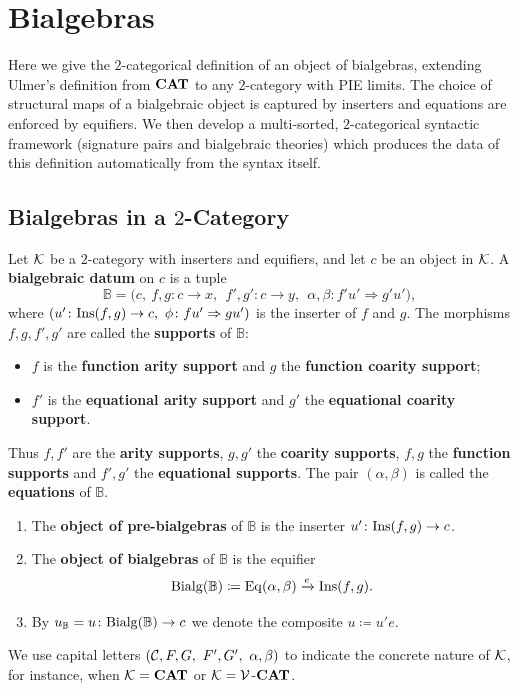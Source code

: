 
\section{Bialgebras}\label{sec:bialgebras}

Here we give the $2$-categorical definition of an object of bialgebras, extending Ulmer's definition \cite{Ulmer1977Bialgebras} from $\mathbf{CAT}$ to any $2$-category with PIE limits. The choice of structural maps of a bialgebraic object is captured by inserters and equations are enforced by equifiers. We then develop a multi-sorted, $2$-categorical syntactic framework (signature pairs and bialgebraic theories) which produces the data of this definition automatically from the syntax itself.

\subsection{Bialgebras in a \texorpdfstring{$2$}{2}-Category}

\begin{definition}\label{def:general_bialgebras}
   Let $\mathcal{K}$ be a $2$-category with inserters and equifiers, and let $c$ be an object in $\mathcal{K}$. A \textbf{bialgebraic datum} on $c$ is a tuple
   $$
   \mathbb{B} = \big(c,\ f,g\colon c\to x,\ \ f',g'\colon c\to y,\ \ \alpha,\beta\colon f'u'\Rightarrow g'u'\big),
   $$
   where $(u'\colon \mathrm{Ins}(f,g)\to c,\ \phi\colon fu'\Rightarrow gu')$ is the inserter of $f$ and $g$. The morphisms $f,g,f',g'$ are called the \textbf{supports} of $\mathbb{B}$:
   \begin{itemize}
       \item $f$ is the \textbf{function arity support} and $g$ the \textbf{function coarity support};
       \item $f'$ is the \textbf{equational arity support} and $g'$ the \textbf{equational coarity support}.
   \end{itemize}
   Thus $f,f'$ are the \textbf{arity supports}, $g,g'$ the \textbf{coarity supports}, $f,g$ the \textbf{function supports} and $f',g'$ the \textbf{equational supports}. The pair $(\alpha,\beta)$ is called the \textbf{equations} of $\mathbb{B}$.
   \begin{enumerate}
       \item The \textbf{object of pre-bialgebras} of $\mathbb{B}$ is the inserter $u'\colon \mathrm{Ins}(f,g)\to c$.
       \item The \textbf{object of bialgebras} of $\mathbb{B}$ is the equifier
       $$
       \mathrm{Bialg}(\mathbb{B})\coloneqq \mathrm{Eq}(\alpha,\beta)\xrightarrow{e}\mathrm{Ins}(f,g).
       $$
       \item By $u_{\mathbb{B}} = u\colon\mathrm{Bialg}(\mathbb{B})\to c$ we denote the composite $u\coloneqq u'e$.
   \end{enumerate}
   We use capital letters $(\C, F,G,\ F',G',\ \alpha,\beta)$ to indicate the concrete nature of $\mathcal{K}$, for instance, when $\mathcal{K} = \mathbf{CAT}$ or $\mathcal{K} =\mathcal{V}$-$\mathbf{CAT}$. 
\end{definition}

